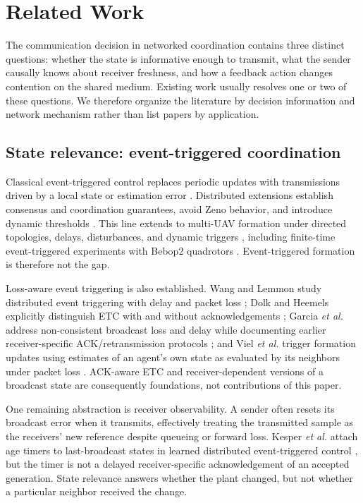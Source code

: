 \section{Related Work}
\label{sec:s2-related}

The communication decision in networked coordination contains three distinct
questions: whether the state is informative enough to transmit, what the
sender causally knows about receiver freshness, and how a feedback action
changes contention on the shared medium. Existing work usually resolves one
or two of these questions. We therefore organize the literature by decision
information and network mechanism rather than list papers by application.

\subsection{State relevance: event-triggered coordination}

Classical event-triggered control replaces periodic updates with transmissions
driven by a local state or estimation error
\cite{astrom2002riemann,tabuada2007event,heemels2012introduction}. Distributed
extensions establish consensus and coordination guarantees, avoid Zeno
behavior, and introduce dynamic thresholds
\cite{dimarogonas2012distributed,seyboth2013eventbased,girard2015dynamic,yi2017distributed,nowzari2019eventtriggered}.
This line extends to multi-UAV formation under directed topologies, delays,
disturbances, and dynamic triggers
\cite{yin2023eventbased,ji2023dynamic,chen2024distributed,yang2025fencing},
including finite-time event-triggered experiments with Bebop2 quadrotors
\cite{wang2022finiteuav}. Event-triggered formation is therefore not the gap.

Loss-aware event triggering is also established. Wang and Lemmon study
distributed event triggering with delay and packet loss
\cite{wang2011eventtriggering}; Dolk and Heemels explicitly distinguish ETC
with and without acknowledgements \cite{dolk2017packetlosses}; Garcia
\emph{et al.} address non-consistent broadcast loss and delay while documenting
earlier receiver-specific ACK/retransmission protocols
\cite{garcia2016unreliable}; and Viel \emph{et al.} trigger formation updates
using estimates of an agent's own state as evaluated by its neighbors under
packet loss \cite{viel2022packetlossformation}. ACK-aware ETC and
receiver-dependent versions of a broadcast state are consequently foundations,
not contributions of this paper.

One remaining abstraction is receiver observability. A sender often resets its
broadcast error when it transmits, effectively treating the transmitted sample
as the receivers' new reference despite queueing or forward loss. Kesper
\emph{et al.} attach age timers to last-broadcast states in learned distributed
event-triggered control \cite{kesper2023toward}, but the timer is not a delayed
receiver-specific acknowledgement of an accepted generation. State relevance
answers whether the plant changed, but not whether a particular neighbor
received the change.

